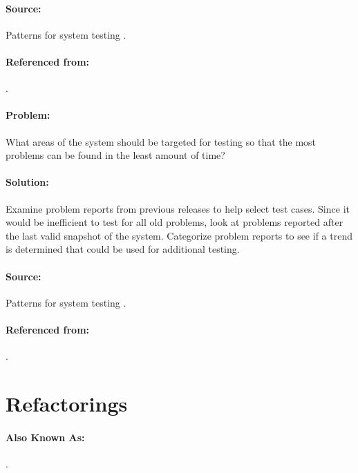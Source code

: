 \documentclass[a4paper,10pt,twoside]{book}
\begin{document}
\paragraph*{Source:}
Patterns for system testing \cite{DeLa98a}.

\paragraph*{Referenced from:}
.


\paragraph*{Problem:}
What areas of the system should be targeted for testing so that the most problems can be found in the least amount of time?

\paragraph*{Solution:}
Examine problem reports from previous releases to help select test cases. Since it would be inefficient to test for all old problems, look at problems reported after the last valid snapshot of the system. Categorize problem reports to see if a trend is determined that could be used for additional testing.

\paragraph*{Source:}
Patterns for system testing \cite{DeLa98a}.

\paragraph*{Referenced from:}
.

\section{Refactorings}


\paragraph*{Also Known As:}
 \cite{Robe99a}.
\end{document}
